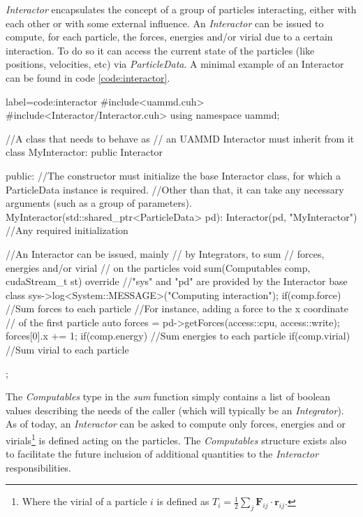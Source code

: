 \documentclass[ twoside,openright,titlepage,numbers=noenddot,%
headinclude,footinclude,cleardoublepage=empty,abstract=on,
BCOR=5mm,paper=b5,fontsize=11pt, dvipsnames
]{scrreprt}
\renewcommand{\vec}[1]{\bm{#1}}
\newcommand{\half}{\frac{1}{2}}
\begin{document}
\emph{Interactor} encapsulates the concept of a group of particles interacting, either with each other or with some external influence.
An \emph{Interactor} can be issued to compute, for each particle, the forces, energies and/or virial due to a certain interaction.
To do so it can access the current state of the particles (like positions, velocities, etc) via \emph{ParticleData}.
A minimal example of an Interactor can be found in code \ref{code:interactor}.
\begin{code2}
  {label=code:interactor}
#include<uammd.cuh>
#include<Interactor/Interactor.cuh>
using namespace uammd;

//A class that needs to behave as 
// an UAMMD Interactor must inherit from it
class MyInteractor: public Interactor{
  public:
  //The constructor must initialize the base Interactor class, for which a ParticleData instance is required.
  //Other than that, it can take any necessary arguments (such as a group of parameters).
  MyInteractor(std::shared_ptr<ParticleData> pd):
          Interactor(pd, "MyInteractor"){
    //Any required initialization 
  }

  //An Interactor can be issued, mainly
  // by Integrators, to sum
  // forces, energies and/or virial
  // on the particles
  void sum(Computables comp, cudaStream_t st) override{
    //"sys" and "pd" are provided by the Interactor base class
    sys->log<System::MESSAGE>("Computing interaction");
    if(comp.force){
      //Sum forces to each particle
      //For instance, adding a force to the x coordinate
      // of the first particle
      auto forces = pd->getForces(access::cpu, access::write);
      forces[0].x += 1;
    }
    if(comp.energy){
      //Sum energies to each particle
    }
    if(comp.virial){
      //Sum virial to each particle
    }
  }
};

\end{code2}

The \emph{Computables} type in the \emph{sum} function simply contains a list of boolean values describing the needs of the caller (which will typically be an \emph{Integrator}). As of today, an \emph{Interactor} can be asked to compute only forces, energies and or virials\footnote{Where the virial of a particle $i$ is defined as $T_i=\half\sum_j\vec{F}_{ij}\cdot\vec{r}_{ij}$.} is defined acting on the particles. The \emph{Computables} structure exists also to facilitate the future inclusion of additional quantities to the \emph{Interactor} responsibilities.
\end{document}
